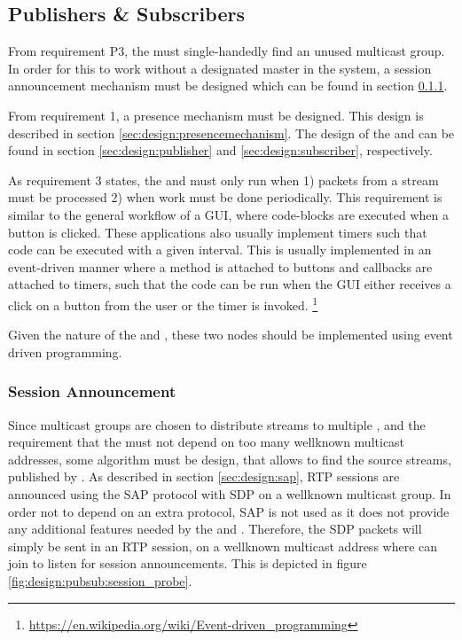 \subsection{Publishers \& Subscribers}
From requirement P3, the \pub{} must single-handedly find an unused multicast group. In order for this to work without a designated master in the system, a session announcement mechanism must be designed which can be found in section \ref{sec:design:sessionannouncement}.


\noindent From requirement 1, a presence mechanism must be designed. This design is described in section \ref{sec:design:presencemechanism}. The design of the \pubs{} and \subs{} can be found in section \ref{sec:design:publisher} and \ref{sec:design:subscriber}, respectively.

As requirement 3 states, the \pubs{} and \subs{} must only run when 1) packets from a stream must be processed  2) when work must be done periodically. This requirement is similar to the general workflow of a \ac{GUI}, where code-blocks are executed when a button is clicked. These applications also usually implement timers such that code can be executed with a given interval. This is usually implemented in an event-driven manner where a method is attached to buttons and callbacks are attached to timers, such that the code can be run when the GUI either receives a click on a button from the user or the timer is invoked. \footnote{\url{https://en.wikipedia.org/wiki/Event-driven_programming}}

Given the nature of the \pubs{} and \subs{}, these two nodes should be implemented using event driven programming.


\subsubsection{Session Announcement} \label{sec:design:sessionannouncement}
Since multicast groups are chosen to distribute streams to multiple \subs, and the requirement that the \sub{} must not depend on too many wellknown multicast addresses, some algorithm must be design, that allows \subs{} to find the source streams, published by \pubs. As described in section \ref{sec:design:sap}, RTP sessions are announced using the SAP protocol with SDP on a wellknown multicast group. In order not to depend on an extra protocol, SAP is not used as it does not provide any additional features needed by the \pubs{} and \subs{}. Therefore, the SDP packets will simply be sent in an RTP session, on a wellknown multicast address where \subs{} can join to listen for session announcements. This is depicted in figure \ref{fig:design:pubsub:session_probe}.

